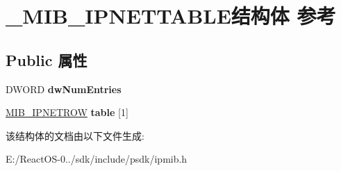 \hypertarget{struct___m_i_b___i_p_n_e_t_t_a_b_l_e}{}\section{\+\_\+\+M\+I\+B\+\_\+\+I\+P\+N\+E\+T\+T\+A\+B\+L\+E结构体 参考}
\label{struct___m_i_b___i_p_n_e_t_t_a_b_l_e}
\subsection*{Public 属性}
\begin{DoxyCompactItemize}
\item 
\mbox{\label{struct___m_i_b___i_p_n_e_t_t_a_b_l_e_a9c3269389a672ce48c5cb71852c528f5}} 
D\+W\+O\+RD {\bfseries dw\+Num\+Entries}
\item 
\mbox{\label{struct___m_i_b___i_p_n_e_t_t_a_b_l_e_ad9e1e63ac05aad9a894f5f70d67d4f6b}} 
\hyperlink{struct___m_i_b___i_p_n_e_t_r_o_w}{M\+I\+B\+\_\+\+I\+P\+N\+E\+T\+R\+OW} {\bfseries table} \mbox{[}1\mbox{]}
\end{DoxyCompactItemize}


该结构体的文档由以下文件生成\+:\begin{DoxyCompactItemize}
\item 
E\+:/\+React\+O\+S-\/0../sdk/include/psdk/ipmib.\+h\end{DoxyCompactItemize}
